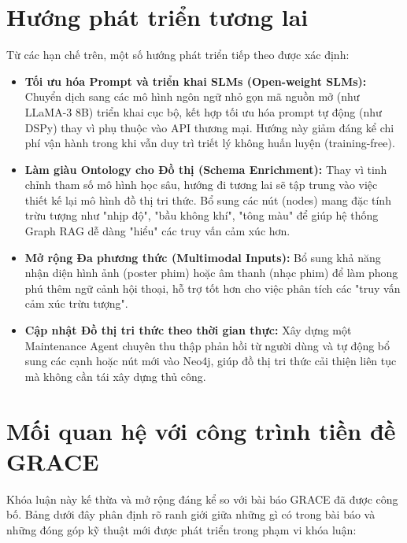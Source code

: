 \section{Hướng phát triển tương lai}
Từ các hạn chế trên, một số hướng phát triển tiếp theo được xác định:
\begin{itemize}
  \item \textbf{Tối ưu hóa Prompt và triển khai SLMs (Open-weight SLMs):} Chuyển dịch sang các mô hình ngôn ngữ nhỏ gọn mã nguồn mở (như LLaMA-3 8B) triển khai cục bộ, kết hợp tối ưu hóa prompt tự động (như DSPy) thay vì phụ thuộc vào API thương mại. Hướng này giảm đáng kể chi phí vận hành trong khi vẫn duy trì triết lý không huấn luyện (training-free).
  \item \textbf{Làm giàu Ontology cho Đồ thị (Schema Enrichment):} Thay vì tinh chỉnh tham số mô hình học sâu, hướng đi tương lai sẽ tập trung vào việc thiết kế lại mô hình đồ thị tri thức. Bổ sung các nút (nodes) mang đặc tính trừu tượng như "nhịp độ", "bầu không khí", "tông màu" để giúp hệ thống Graph RAG dễ dàng "hiểu" các truy vấn cảm xúc hơn.
  \item \textbf{Mở rộng Đa phương thức (Multimodal Inputs):} Bổ sung khả năng nhận diện hình ảnh (poster phim) hoặc âm thanh (nhạc phim) để làm phong phú thêm ngữ cảnh hội thoại, hỗ trợ tốt hơn cho việc phân tích các "truy vấn cảm xúc trừu tượng".
  \item \textbf{Cập nhật Đồ thị tri thức theo thời gian thực:} Xây dựng một Maintenance Agent chuyên thu thập phản hồi từ người dùng và tự động bổ sung các cạnh hoặc nút mới vào Neo4j, giúp đồ thị tri thức cải thiện liên tục mà không cần tái xây dựng thủ công.
\end{itemize}

\section{Mối quan hệ với công trình tiền đề GRACE}

Khóa luận này kế thừa và mở rộng đáng kể so với bài báo GRACE \cite{phan2025grace} đã được công bố. Bảng dưới đây phân định rõ ranh giới giữa những gì có trong bài báo và những đóng góp kỹ thuật mới được phát triển trong phạm vi khóa luận:

